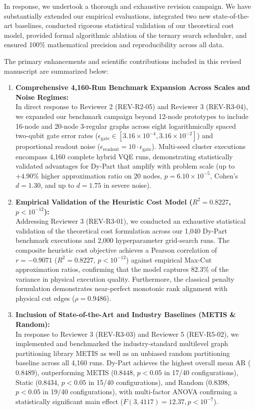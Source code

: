 \documentclass[11pt,a4paper]{article}
\begin{document}
In response, we undertook a thorough and exhaustive revision campaign. We have substantially extended our empirical evaluations, integrated two new state-of-the-art baselines, conducted rigorous statistical validation of our theoretical cost model, provided formal algorithmic ablation of the ternary search scheduler, and ensured 100\% mathematical precision and reproducibility across all data. 

\vspace{0.6em}
\noindent
The primary enhancements and scientific contributions included in this revised manuscript are summarized below:

\begin{enumerate}[leftmargin=1.5em, itemsep=0.45em]
    \item \textbf{Comprehensive 4,160-Run Benchmark Expansion Across Scales and Noise Regimes:}\\
    In direct response to Reviewer 2 (REV-R2-05) and Reviewer 3 (REV-R3-04), we expanded our benchmark campaign beyond 12-node prototypes to include 16-node and 20-node 3-regular graphs across eight logarithmically spaced two-qubit gate error rates ($\epsilon_{\text{gate}} \in [3.16 \times 10^{-4}, 3.16 \times 10^{-2}]$) and proportional readout noise ($\epsilon_{\text{readout}} = 10 \cdot \epsilon_{\text{gate}}$). Multi-seed cluster executions encompass 4,160 complete hybrid VQE runs, demonstrating statistically validated advantages for Dy-Part that amplify with problem scale (up to $+4.90\%$ higher approximation ratio on 20 nodes, $p = 6.10 \times 10^{-5}$, Cohen's $d = 1.30$, and up to $d = 1.75$ in severe noise).

    \item \textbf{Empirical Validation of the Heuristic Cost Model ($R^2 = 0.8227$, $p < 10^{-12}$):}\\
    Addressing Reviewer 3 (REV-R3-01), we conducted an exhaustive statistical validation of the theoretical cost formulation across our 1,040 Dy-Part benchmark executions and 2,000 hyperparameter grid-search runs. The composite heuristic cost objective achieves a Pearson correlation of $r = -0.9071$ ($R^2 = 0.8227$, $p < 10^{-12}$) against empirical Max-Cut approximation ratios, confirming that the model captures $82.3\%$ of the variance in physical execution quality. Furthermore, the classical penalty formulation demonstrates near-perfect monotonic rank alignment with physical cut edges ($\rho = 0.9486$).

    \item \textbf{Inclusion of State-of-the-Art and Industry Baselines (METIS \& Random):}\\
    In response to Reviewer 3 (REV-R3-03) and Reviewer 5 (REV-R5-02), we implemented and benchmarked the industry-standard multilevel graph partitioning library METIS as well as an unbiased random partitioning baseline across all 4,160 runs. Dy-Part achieves the highest overall mean AR ($0.8489$), outperforming METIS ($0.8448$, $p < 0.05$ in 17/40 configurations), Static ($0.8434$, $p < 0.05$ in 15/40 configurations), and Random ($0.8398$, $p < 0.05$ in 19/40 configurations), with multi-factor ANOVA confirming a statistically significant main effect ($F(3, 4117) = 12.37, p < 10^{-7}$).


\end{enumerate}
\end{document}
